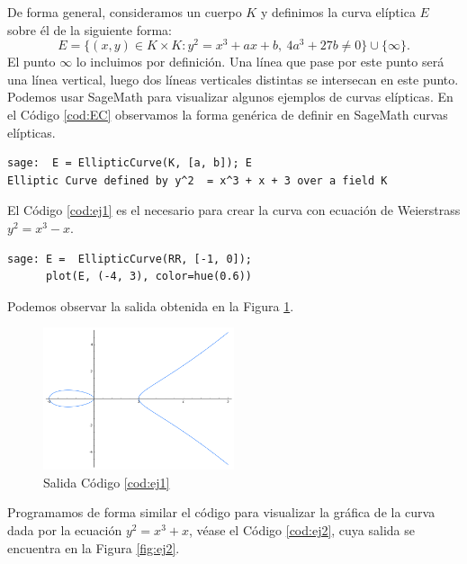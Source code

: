 \documentclass[11pt]{article}
\begin{document}
De forma general, consideramos un cuerpo $K$ y definimos la curva elíptica $E$ sobre él de la siguiente forma:
\[E = \{(x,y) \in K\times K : y^2 = x^3 + ax +b,\ 4a^3+27b \neq 0\} \cup \{\infty\}.
\]
El punto $\infty$ lo incluimos por definición. Una línea que pase por este punto será una línea vertical, luego dos líneas verticales distintas se intersecan en este punto.\\

Podemos usar SageMath para visualizar algunos ejemplos de curvas elípticas. En el Código \ref{cod:EC} observamos la forma genérica de definir en SageMath curvas elípticas.\\

\begin{lstlisting}[label={cod:EC}, caption={Curva elíptica en Sage}, morekeywords={sage}]
sage:  E = EllipticCurve(K, [a, b]); E
Elliptic Curve defined by y^2  = x^3 + x + 3 over a field K
\end{lstlisting}

El Código \ref{cod:ej1} es el necesario para crear la curva con ecuación de Weierstrass $y^2=x^3-x$.

\begin{lstlisting}[label={cod:ej1}, caption={Curva elíptica $y^2=x^3-x$}, morekeywords={sage}]
sage: E =  EllipticCurve(RR, [-1, 0]);
      plot(E, (-4, 3), color=hue(0.6))
\end{lstlisting}

Podemos observar la salida obtenida en la Figura \ref{fig:ej1}.

\begin{figure}[H]
    \centering
    \includegraphics[height=0.5\textwidth, width=0.5\textwidth]{ej1}
    \caption{Salida Código \ref{cod:ej1}}
    \label{fig:ej1}
\end{figure}

Programamos de forma similar el código para visualizar la gráfica de la curva dada por la ecuación $y^2=x^3+x$, véase el Código \ref{cod:ej2}, cuya salida se encuentra en la Figura \ref{fig:ej2}.
\end{document}
